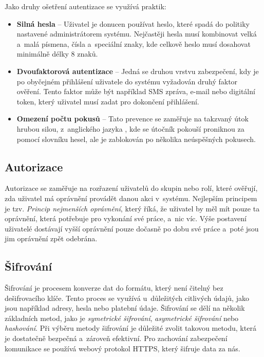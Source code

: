 \noindent
Jako druhy ošetření autentizace se využívá praktik:
\begin{itemize}
    \item \textbf{Silná hesla} -- Uživatel je donucen používat heslo, které spadá do politiky nastavené administrátorem systému. Nejčastěji hesla musí kombinovat velká a~malá písmena, čísla a~speciální znaky, kde celkově heslo musí dosahovat minimálně délky 8 znaků.
    \item \textbf{Dvoufaktorová autentizace} -- Jedná se druhou vrstvu zabezpečení, kdy je po obyčejném přihlášení uživatele do systému vyžadován druhý faktor ověření. Tento faktor může být například SMS zpráva, e-mail nebo digitální token, který uživatel musí zadat pro dokončení přihlášení.
    \item \textbf{Omezení počtu pokusů} -- Tato prevence se zaměřuje na takzvaný útok hrubou silou, z~anglického jazyka \textit{}, kde se útočník pokouší proniknou za pomocí slovníku hesel, ale je zablokován po několika neúspěšných pokusech.
\end{itemize}

\subsection{Autorizace}
\label{subsec:security-authorization}
Autorizace se zaměřuje na rozřazení uživatelů do skupin nebo rolí, které ověřují, zda uživatel má oprávnění provádět danou akci v~systému. Nejlepším principem je tzv. \textit{Princip nejmenších oprávnění}, který říká, že uživatel by měl mít pouze ta oprávnění, která potřebuje pro vykonání své práce, a~nic víc. Výše postavení uživatelé dostávají vyšší oprávnění pouze dočasně po dobu své práce a~poté jsou jim oprávnění zpět odebrána.

\subsection{Šifrování}
\label{subsec:security-encryption}
Šifrování je procesem konverze dat do formátu, který není čitelný bez dešifrovacího klíče. Tento proces se využívá u~důležitých citlivých údajů, jako jsou například adresy, hesla nebo platební údaje. Šifrování se dělí na několik základních metod, jako je \textit{symetrické šifrování}, \textit{asymetrické šifrování} nebo \textit{hashování}. Při výběru metody šifrování je důležité zvolit takovou metodu, která je dostatečně bezpečná a~zároveň efektivní. Pro zachování zabezpečení komunikace se používá webový protokol HTTPS, který šifruje data za nás.

